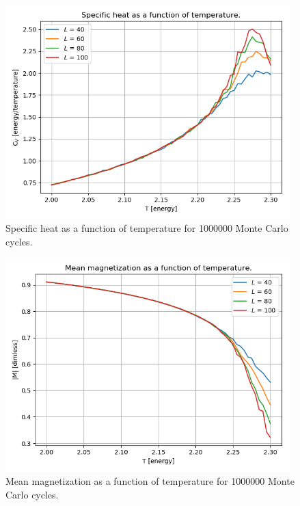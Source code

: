 \documentclass{article}
\begin{document}
  \begin{figure}[ht]
      \centering
      \includegraphics[width = 11cm]{img/tempvsspecificheat2.png}
      \caption{Specific heat as a function of temperature for 1000000 Monte Carlo cycles.}
      \label{fig:tempvsspecitifheat2}
    \end{figure}

  \begin{figure}[ht]
      \centering
      \includegraphics[width = 11cm]{img/tempvsmeanmagnetization2.png}
      \caption{Mean magnetization as a function of temperature for 1000000 Monte Carlo cycles.}
      \label{fig:tempvsmeanmagnetization2}
    \end{figure}
\end{document}

